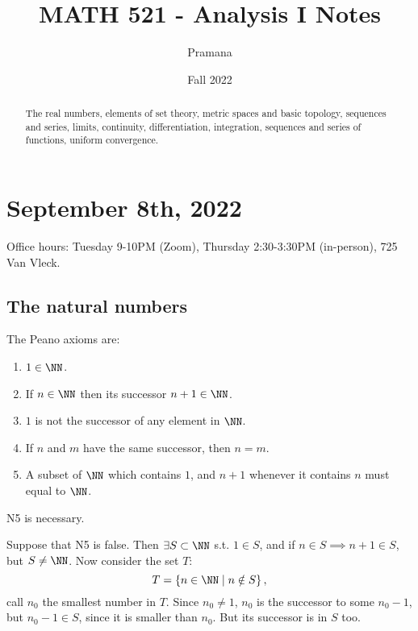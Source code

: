 \documentclass[11pt]{scrartcl}
\title{MATH 521 - Analysis I Notes}
\author{Pramana}
\date{Fall 2022}
\numberwithin{equation}{section}
\begin{document}
\maketitle
\begin{abstract}
    The real numbers, elements of set theory, metric spaces and basic topology, sequences and series, limits, continuity, differentiation, integration, sequences and series of functions, uniform convergence.    
\end{abstract}
\tableofcontents
\clearpage
\section{September 8th, 2022}
Office hours: Tuesday 9-10PM (Zoom), Thursday 2:30-3:30PM (in-person), 725 Van Vleck.
\subsection{The natural numbers}
\begin{axiom}
    The Peano axioms are:
    \begin{enumerate}[N1.]
        \item $1 \in \NN$.
        \item If $n\in\NN$ then its successor $n+1\in\NN$.
        \item $1$ is not the successor of any element in $\NN$. 
        \item If $n$ and $m$ have the same successor, then $n = m$.
        \item A subset of $\NN$ which contains $1$, and $n + 1$ whenever it contains $n$ must equal to $\NN$.
    \end{enumerate}
\end{axiom}
\begin{claim}
    \label{cl:n5necessary}
    N5 is necessary.
\end{claim}
\begin{subproof}
Suppose that N5 is false. Then $\exists S \subset \NN$ s.t. $1 \in S$, and if 
$n \in S \implies n+1\in S$, but $S \neq \NN$. Now consider the set $T$:
\[ T = \left\{n \in \NN\mid n\notin S\right\},\]
call $n_0$ the smallest number in $T$. Since $n_0\neq1$, $n_0$ is the successor to some $n_0-1$, but $n_0-1\in S$, since it is smaller than $n_0$. But its successor is in $S$ too.
\end{subproof}
\end{document}
